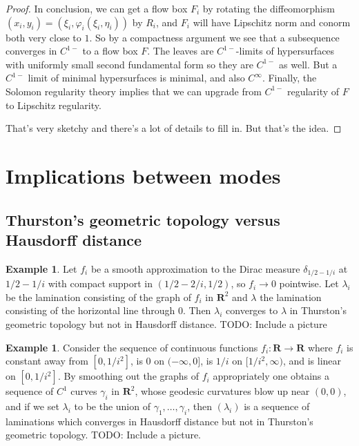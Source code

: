 \documentclass[reqno,10pt]{amsart}
\newcommand{\RR}{\mathbf{R}}
\theoremstyle{definition}
\newtheorem{example}[theorem]{Example}
\numberwithin{equation}{section}
\begin{document}
\begin{proof}
In conclusion, we can get a flow box $F_i$ by rotating the diffeomorphism $(x_i, y_i) = (\xi_i, \varphi_i(\xi_i, \eta_i))$ by $R_i$, and $F_i$ will have Lipschitz norm and conorm both very close to $1$.
So by a compactness argument we see that a subsequence converges in $C^{1-}$ to a flow box $F$.
The leaves are $C^{1-}$-limits of hypersurfaces with uniformly small second fundamental form so they are $C^{1-}$ as well.
But a $C^{1-}$ limit of minimal hypersurfaces is minimal, and also $C^\infty$.
Finally, the Solomon regularity theory implies that we can upgrade from $C^{1-}$ regularity of $F$ to Lipschitz regularity.

That's very sketchy and there's a lot of details to fill in. But that's the idea.
\end{proof}


\section{Implications between modes}

\subsection{Thurston's geometric topology versus Hausdorff distance}


\begin{example}
Let $f_i$ be a smooth approximation to the Dirac measure $\delta_{1/2-1/i}$ at $1/2 - 1/i$ with compact support in $(1/2 - 2/i, 1/2)$, so $f_i \to 0$ pointwise.
Let $\lambda_i$ be the lamination consisting of the graph of $f_i$ in $\RR^2$ and $\lambda$ the lamination consisting of the horizontal line through $0$.
Then $\lambda_i$ converges to $\lambda$ in Thurston's geometric topology but not in Hausdorff distance.
TODO: Include a picture
\end{example}

\begin{example}\label{Hausdorff does not imply Thurston}
Consider the sequence of continuous functions $f_i: \RR \to \RR$ where $f_i$ is constant away from $[0, 1/i^2]$, is $0$ on $(-\infty, 0]$, is $1/i$ on $[1/i^2, \infty)$, and is linear on $[0, 1/i^2]$.
By smoothing out the graphs of $f_i$ appropriately one obtains a sequence of $C^1$ curves $\gamma_i$ in $\RR^2$, whose geodesic curvatures blow up near $(0, 0)$, and if we set $\lambda_i$ to be the union of $\gamma_1, \dots, \gamma_i$, then $(\lambda_i)$ is a sequence of laminations which converges in Hausdorff distance but not in Thurston's geometric topology.
TODO: Include a picture.
\end{example}
\end{document}
